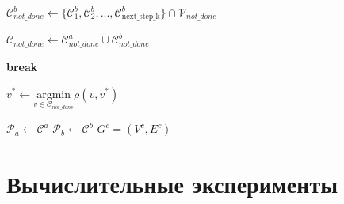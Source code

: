 \documentclass{article}
\begin{document}
\begin{algorithm}
\begin{algorithmic}[1]
        \State $\mathcal{C}^b_{not\_done} \gets \{\mathcal{C}^b_1, \mathcal{C}^b_2, ..., \mathcal{C}^b_{ \text{next\_step\_k} } \}  \cap \mathcal{V}_{not\_done}$
        
        
        \State $\mathcal{C}_{not\_done} \gets \mathcal{C}^a_{not\_done} \cup \mathcal{C}^b_{not\_done}$
        
            \State \textbf{break}
        \EndIf
        
        \State $v^* \gets \underset{v \in \mathcal{C}_{not\_done}}{\mathrm{argmin}} \rho(v, v^*)$
        
        \State $\mathcal{P}_a \gets \mathcal{C}^a$
        \State $\mathcal{P}_b \gets \mathcal{C}^b$
    \EndWhile
\EndWhile
\State \Return $G^c=(V^c,E^c)$
\end{algorithmic}
\end{algorithm}

\section{Вычислительные эксперименты}

\end{document}
